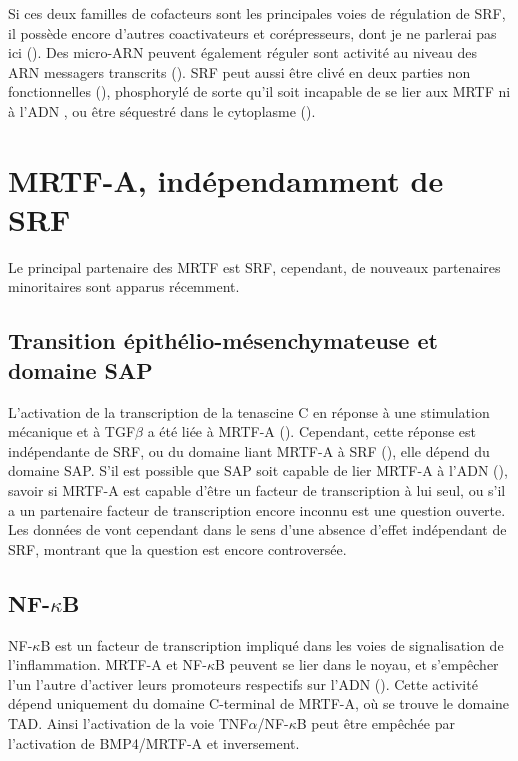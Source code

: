 Si ces deux familles de cofacteurs sont les principales voies de régulation de SRF, il possède encore d'autres coactivateurs et corépresseurs, dont je ne parlerai pas ici (\cite{posern_actin_2006}). Des micro-ARN peuvent également réguler sont activité au niveau des ARN messagers transcrits (\cite{chen_role_2006}). 
SRF peut aussi être clivé en deux parties non fonctionnelles  (\cite{drewett_serum_2001}), phosphorylé de sorte qu'il soit incapable de se lier aux MRTF ni à l'ADN \parencite{iyer_novel_2003}, ou être séquestré dans le cytoplasme (\cite{lange_kinase_2005}).   


\section{MRTF-A, indépendamment de SRF}

Le principal partenaire des MRTF est SRF, cependant, de nouveaux partenaires minoritaires sont apparus récemment. 

\subsection{Transition épithélio-mésenchymateuse et domaine SAP}

L'activation de la transcription de la tenascine C en réponse à une stimulation mécanique et à TGF$\beta$ a été liée à MRTF-A (\cite{maier_tenascin-c_2008}). Cependant, cette réponse est indépendante de SRF, ou du domaine liant MRTF-A à SRF (\cite{asparuhova_transcriptional_2011}), elle dépend du domaine SAP. 
S'il est possible que SAP soit capable de lier MRTF-A à l'ADN (\cite{aravind_sapputative_2000}), savoir si MRTF-A est capable d'être un facteur de transcription à lui seul, ou s'il a un partenaire facteur de transcription encore inconnu est une question ouverte. Les données de  \cite{esnault_rho-actin_2014} vont cependant dans le sens d'une absence d'effet indépendant de SRF, montrant que la question est encore controversée. 


\subsection{NF-$\kappa$B}

NF-$\kappa$B est un facteur de transcription impliqué dans les voies de signalisation de l'inflammation. MRTF-A et NF-$\kappa$B peuvent se lier dans le noyau, et s'empêcher l'un l'autre d'activer leurs promoteurs respectifs sur l'ADN (\cite{wang_bone_2012}). 
Cette activité dépend uniquement du domaine C-terminal de MRTF-A, où se trouve le domaine TAD. 
Ainsi l'activation de la voie TNF$\alpha$/NF-$\kappa$B peut être empêchée par l'activation de BMP4/MRTF-A et inversement. 

